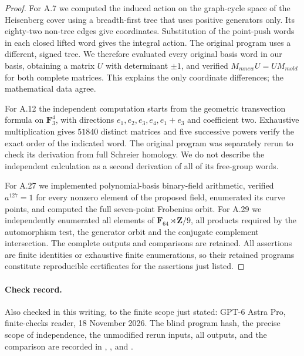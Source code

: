 \begin{proof}
For A.7 we computed the induced action on the graph-cycle space of
the Heisenberg cover using a breadth-first tree that uses positive
generators only. Its eighty-two non-tree edges give coordinates.
Substitution of the point-push words in each closed lifted word gives
the integral action. The original program uses a different, signed
tree. We therefore evaluated every original basis word in our basis,
obtaining a matrix $U$ with determinant $\pm1$, and verified
$M_{
m new}U=UM_{
m old}$ for both complete matrices. This
explains the only coordinate differences; the mathematical data agree.

For A.12 the independent computation starts from the geometric
transvection formula on $\mathbf F _3^4$, with directions
$e_1,e_2,e_3,e_4,e_1+e_3$ and coefficient two. Exhaustive multiplication
gives $51840$ distinct matrices and five successive powers verify
the exact order of the indicated word. The original program was
separately rerun to check its derivation from full Schreier homology.
We do not describe the independent calculation as a second derivation
of all of its free-group words.

For A.27 we implemented polynomial-basis binary-field arithmetic,
verified $a^{127}=1$ for every nonzero element of the proposed
field, enumerated its curve points, and computed the full seven-point
Frobenius orbit. For A.29 we independently enumerated all elements
of $\mathbf F _{64}\rtimes\mathbf Z/9$, all products required by
the automorphism test, the generator orbit and the conjugate
complement intersection. The complete outputs and comparisons are
retained. All assertions are finite identities or exhaustive finite
enumerations, so their retained programs constitute reproducible
certificates for the assertions just listed.
\end{proof}

\paragraph{Check record.}
Also checked in this writing, to the finite scope just stated:
GPT-6 Astra Pro, finite-checks reader, 18 November 2026. The blind
program hash, the precise scope of independence, the unmodified
rerun inputs, all outputs, and the comparison are recorded in
, ,
and .
